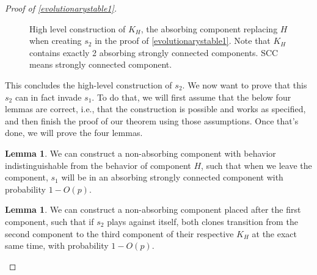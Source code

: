\documentclass[12pt]{article}
\theoremstyle{definition}
\newtheorem{lemma}[theorem]{Lemma}
\theoremstyle{remark}
\begin{document}
\begin{proof}[Proof of \cref{evolutionarystable1}]
\begin{figure}
        \caption{High level construction of $K_H$, the absorbing component replacing $H$ when creating $s_2$ in the proof of \cref{evolutionarystable1}. Note that $K_H$ contains exactly 2 absorbing strongly connected components. SCC means strongly connected component.}
        \label{c2flowchart}
      \end{figure}
      
      This concludes the high-level construction of $s_2$. We now want to prove that this $s_2$ can in fact invade $s_1$. To do that, we will first assume that the below four lemmas are correct, i.e., that the construction is possible and works as specified, and then finish the proof of our theorem using those assumptions. Once that's done, we will prove the four lemmas.

      \begin{lemma}
        \label{claimcanwaitfors1}
        We can construct a non-absorbing component with behavior indistinguishable from the behavior of component $H$, such that when we leave the component, $s_1$ will be in an absorbing strongly connected component with probability $1 - O(p)$.
      \end{lemma}

      \begin{lemma}
        \label{claimcansyncs2}
        We can construct a non-absorbing component placed after the first component, such that if $s_2$ plays against itself, both clones transition from the second component to the third component of their respective $K_H$ at the exact same time, with probability $1 - O(p)$.
      \end{lemma}


\end{proof}
\end{document}
